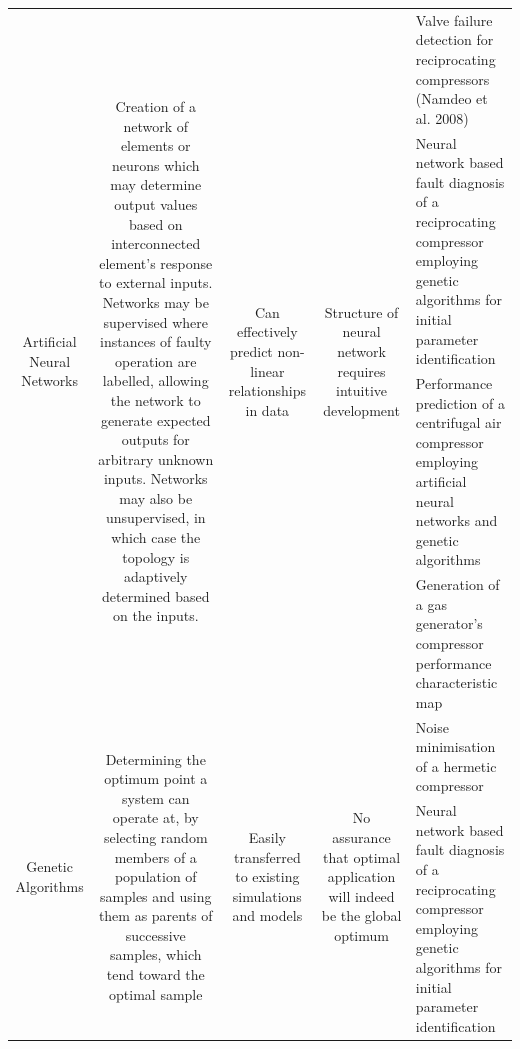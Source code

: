 \begin{center}
\begin{longtable}{p{}p{}p{}p{}p{}}
        
    \multicolumn{1}{c}{\multirow{4}[0]{.18\textwidth}{Artificial Neural Networks}} & \multicolumn{1}{c}{\multirow{4}[0]{.18\textwidth}{Creation of a network of elements or neurons which may determine output values based on interconnected element's response to external inputs. Networks may be supervised where instances of faulty operation are labelled, allowing the network to generate expected outputs for arbitrary unknown inputs. Networks may also be unsupervised, in which case the topology is adaptively determined based on the inputs.}} & \multicolumn{1}{c}{\multirow{4}[0]{.18\textwidth}{Can effectively predict non-linear relationships in data}} & \multicolumn{1}{c}{\multirow{4}[0]{.18\textwidth}{Structure of neural network requires intuitive development}} & Valve failure detection for reciprocating compressors (Namdeo et al. 2008) \\
    \multicolumn{1}{c}{} & \multicolumn{1}{c}{} & \multicolumn{1}{c}{} & \multicolumn{1}{c}{} & Neural network based fault diagnosis of a reciprocating compressor employing genetic algorithms for initial parameter identification \cite{Jinru2008}\\
    \multicolumn{1}{c}{} & \multicolumn{1}{c}{} & \multicolumn{1}{c}{} & \multicolumn{1}{c}{} & Performance prediction of a centrifugal air compressor employing artificial neural networks and genetic algorithms \cite{LuoFangqiong2011}\\
    \multicolumn{1}{c}{} & \multicolumn{1}{c}{} & \multicolumn{1}{c}{} & \multicolumn{1}{c}{} & Generation of a gas generator’s compressor performance characteristic map \cite{Ghorbanian2009} \cite{Yu2007}\\
    \midrule
    \multicolumn{1}{c}{\multirow{4}[0]{.18\textwidth}{Genetic Algorithms}} & \multicolumn{1}{c}{\multirow{4}[0]{.18\textwidth}{Determining the optimum point a system can operate at, by selecting random members of a population of samples and using them as parents of successive samples, which tend toward the optimal sample}} & \multicolumn{1}{c}{\multirow{4}[0]{.18\textwidth}{Easily transferred to existing simulations and  models}} & \multicolumn{1}{c}{\multirow{4}[0]{.18\textwidth}{No assurance that optimal application will indeed be the global optimum}} & Noise minimisation of a hermetic compressor \cite{Dasilva2004}\\
    \multicolumn{1}{c}{} & \multicolumn{1}{c}{} & \multicolumn{1}{c}{} & \multicolumn{1}{c}{} & Neural network based fault diagnosis of a reciprocating compressor employing genetic algorithms for initial parameter identification \cite{Jinru2008} \\ %

\end{longtable}
\end{center}
